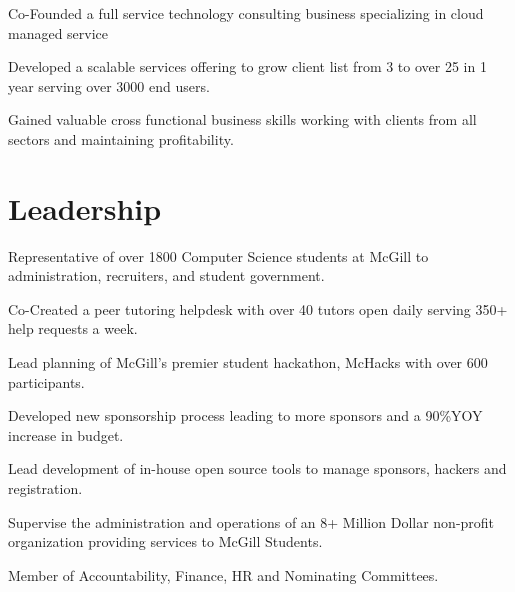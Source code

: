 \documentclass[]{deedy-resume-openfont}
\begin{document}
\begin{minipage}[t]{0.66\textwidth}
\begin{tightemize}
\item Co-Founded a full service technology consulting business specializing in cloud managed service
\item Developed a scalable services offering to grow client list from 3 to over 25 in 1 year serving over 3000 end users.
\item Gained valuable cross functional business skills working with clients from all sectors and maintaining profitability.
\end{tightemize}
\sectionsep


\section{Leadership}
\begin{tightemize}
\item Representative of over 1800 Computer Science students at McGill to administration, recruiters, and student government. 
\item Co-Created a peer tutoring helpdesk with over 40 tutors open daily serving 350+ help requests a week.
\end{tightemize}
\sectionsep

\begin{tightemize}
\item Lead planning of McGill's premier student hackathon, McHacks with over 600 participants.
\item Developed new sponsorship process leading to more sponsors and a 90\%YOY increase in budget.
\item Lead development of in-house open source tools to manage sponsors, hackers and registration.
\end{tightemize}
\sectionsep

\begin{tightemize}
\item Supervise the administration and operations of an 8+ Million Dollar non-profit organization providing services to McGill Students. 
\item Member of Accountability, Finance, HR and Nominating Committees. 
\end{tightemize}
\sectionsep


\end{minipage}
\end{document}
